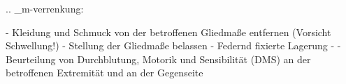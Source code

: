 
.. _m-verrenkung:


\begin{itemize}
  -   Kleidung und Schmuck von der betroffenen Gliedmaße entfernen 
  (Vorsicht Schwellung!)
  -   Stellung der Gliedmaße belassen
  -   Federnd fixierte Lagerung
  -   
  -   Beurteilung von Durchblutung, Motorik und
  Sensibilität (DMS) an der betroffenen Extremität und an
  der Gegenseite
\end{itemize}